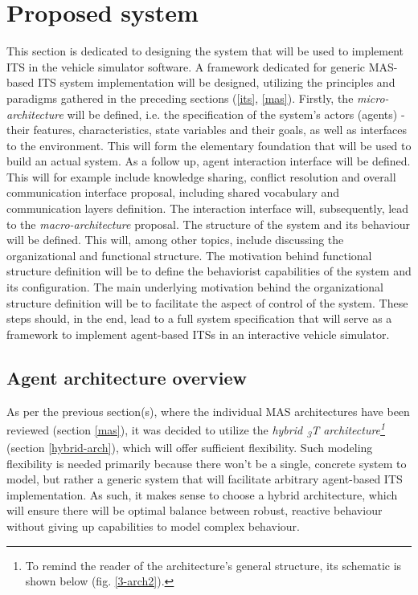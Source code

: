 \documentclass[main.tex]{subfiles}
\begin{document}
    
\section{Proposed system}\label{sec-system}

This section is dedicated to designing the system that will be used to implement ITS in the
vehicle simulator software. A framework dedicated for generic MAS-based ITS system
implementation will be designed, utilizing the principles and paradigms gathered in the
preceding sections (\ref{its}, \ref{mas}). Firstly, the \emph{micro-architecture} will be
defined, i.e. the specification of the system's actors (agents) - their features,
characteristics, state variables and their goals, as well as interfaces to the environment.
This will form the elementary foundation that will be used to build an actual system. As a
follow up, agent interaction interface will be defined. This will for example include
knowledge sharing, conflict resolution and overall communication interface proposal, including
shared vocabulary and communication layers definition. The interaction interface will,
subsequently, lead to the \emph{macro-architecture} proposal. The structure of the system and
its behaviour will be defined. This will, among other topics, include discussing the
organizational and functional structure. The motivation behind functional structure definition
will be to define the behaviorist capabilities of the system and its configuration. The main
underlying motivation behind the organizational structure definition will be to facilitate the
aspect of control of the system. These steps should, in the end, lead to a full system
specification that will serve as a framework to implement agent-based ITSs in an interactive
vehicle simulator.

\subsection{Agent architecture overview}

As per the previous section(s), where the individual MAS architectures have been reviewed
(section \ref{mas}), it was decided to utilize  the \emph{hybrid \textsubscript{3}T
architecture\footnote{To remind the reader of the architecture's general structure, its
schematic is shown below (fig. \ref{3-arch2}).}} (section \ref{hybrid-arch}), which will offer
sufficient flexibility.  Such modeling flexibility is needed primarily because there won't be a
single, concrete system to model, but rather a generic system that will facilitate arbitrary
agent-based ITS implementation. As such, it makes sense to choose a hybrid architecture, which
will ensure there will be optimal balance between robust, reactive behaviour without giving up
capabilities to model complex behaviour.
\end{document}

